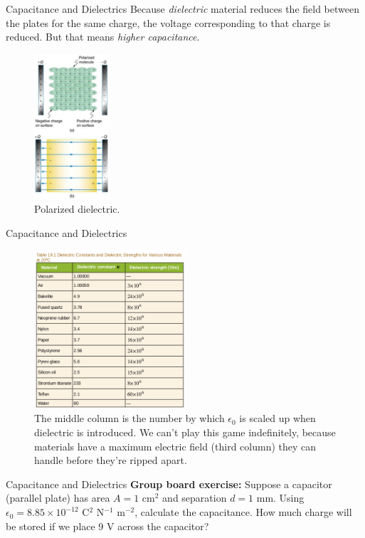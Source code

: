 \documentclass{beamer}
\begin{document}
\begin{frame}{Capacitance and Dielectrics}
Because \textit{dielectric} material reduces the field between the plates for the same charge, the voltage corresponding to that charge is reduced.  But that means \textit{higher capacitance}.
\begin{figure}
\centering
\includegraphics[width=0.25\textwidth]{figures/polar.png}
\caption{\label{fig:polar} Polarized dielectric.}
\end{figure}
\end{frame}

\begin{frame}{Capacitance and Dielectrics}
\begin{figure}
\centering
\includegraphics[width=0.5\textwidth]{figures/tableK.png}
\caption{\label{fig:tab} The middle column is the number by which $\epsilon_0$ is scaled up when dielectric is introduced.  We can't play this game indefinitely, because materials have a maximum electric field (third column) they can handle before they're ripped apart.}
\end{figure}
\end{frame}

\begin{frame}{Capacitance and Dielectrics}
\textbf{Group board exercise:} Suppose a capacitor (parallel plate) has area $A = 1$ cm$^2$ and separation $d = 1$ mm.  Using $\epsilon_0 = 8.85 \times 10^{-12}$ C$^2$ N$^{-1}$ m$^{-2}$, calculate the capacitance.  How much charge will be stored if we place 9 V across the capacitor?
\end{frame}
\end{document}
